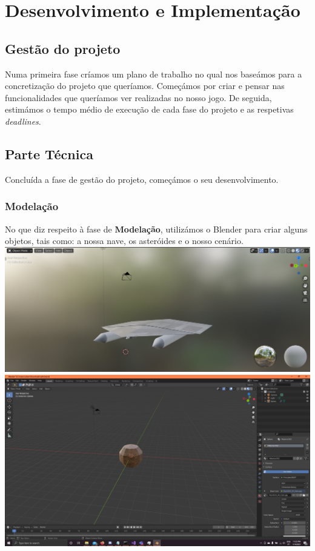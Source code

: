 \chapter{Desenvolvimento e Implementação}
\label{chap:dens-imp}

\section{Gestão do projeto}
\label{chap4:sec:gestao-proj}
Numa primeira fase críamos um plano de trabalho no qual nos baseámos para a concretização do projeto que queríamos.
Começámos por criar e pensar nas funcionalidades que queríamos ver realizadas no nosso jogo. De seguida, estimámos o tempo médio de execução de cada fase do projeto e as respetivas \emph{deadlines}.

\section{Parte Técnica}
\label{chap4:sec:p-tecnica}
Concluída a fase de gestão do projeto, começámos o seu desenvolvimento.

\subsection{Modelação}
No que diz respeito à fase de \textbf{Modelação}, utilizámos o Blender para criar alguns objetos, tais como: a nossa nave, os asteróides e o nosso cenário.
\linebreak
\linebreak
\includegraphics[scale=0.25]{nave.png}
\linebreak
\includegraphics[scale=0.25]{asteroide.png}

